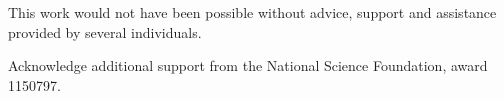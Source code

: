 



\begin{Acknowledgments}
\setlength{\baselineskip}{1.5\baselineskip}
{
This work would not have been possible without advice, support and assistance
provided by several individuals.

Acknowledge additional support from the National Science Foundation, award
1150797.

}
\end{Acknowledgments}
